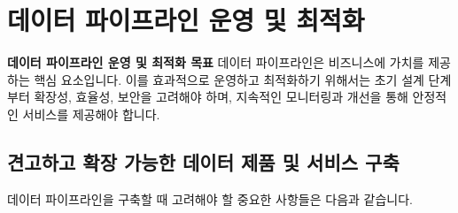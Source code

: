 \documentclass[11pt,a4paper]{article}
\begin{document}
\newpage
\section{데이터 파이프라인 운영 및 최적화}

\begin{conceptbox}
\textbf{데이터 파이프라인 운영 및 최적화 목표}
데이터 파이프라인은 비즈니스에 가치를 제공하는 핵심 요소입니다. 이를 효과적으로 운영하고 최적화하기 위해서는 초기 설계 단계부터 확장성, 효율성, 보안을 고려해야 하며, 지속적인 모니터링과 개선을 통해 안정적인 서비스를 제공해야 합니다.
\end{conceptbox}

\subsection{견고하고 확장 가능한 데이터 제품 및 서비스 구축}
데이터 파이프라인을 구축할 때 고려해야 할 중요한 사항들은 다음과 같습니다.
\end{document}
